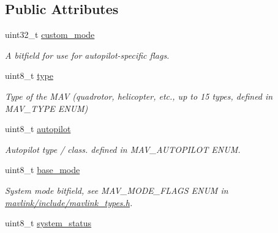 \subsection*{Public Attributes}
\begin{DoxyCompactItemize}
\item 
\hypertarget{struct____mavlink__heartbeat__t_a4d8e5d4a59f775887eaecfd58303e17d}{uint32\+\_\+t \hyperlink{struct____mavlink__heartbeat__t_a4d8e5d4a59f775887eaecfd58303e17d}{custom\+\_\+mode}}\label{struct____mavlink__heartbeat__t_a4d8e5d4a59f775887eaecfd58303e17d}

\begin{DoxyCompactList}\small\item\em A bitfield for use for autopilot-\/specific flags. \end{DoxyCompactList}\item 
\hypertarget{struct____mavlink__heartbeat__t_a2f34a5f641022acd59d9b54e69976341}{uint8\+\_\+t \hyperlink{struct____mavlink__heartbeat__t_a2f34a5f641022acd59d9b54e69976341}{type}}\label{struct____mavlink__heartbeat__t_a2f34a5f641022acd59d9b54e69976341}

\begin{DoxyCompactList}\small\item\em Type of the M\+A\+V (quadrotor, helicopter, etc., up to 15 types, defined in M\+A\+V\+\_\+\+T\+Y\+P\+E E\+N\+U\+M) \end{DoxyCompactList}\item 
\hypertarget{struct____mavlink__heartbeat__t_a5be04782d8a0bb715ad26c25cce74b9b}{uint8\+\_\+t \hyperlink{struct____mavlink__heartbeat__t_a5be04782d8a0bb715ad26c25cce74b9b}{autopilot}}\label{struct____mavlink__heartbeat__t_a5be04782d8a0bb715ad26c25cce74b9b}

\begin{DoxyCompactList}\small\item\em Autopilot type / class. defined in M\+A\+V\+\_\+\+A\+U\+T\+O\+P\+I\+L\+O\+T E\+N\+U\+M. \end{DoxyCompactList}\item 
\hypertarget{struct____mavlink__heartbeat__t_a816ec38dcbb0f4948185efbdd96ebb5e}{uint8\+\_\+t \hyperlink{struct____mavlink__heartbeat__t_a816ec38dcbb0f4948185efbdd96ebb5e}{base\+\_\+mode}}\label{struct____mavlink__heartbeat__t_a816ec38dcbb0f4948185efbdd96ebb5e}

\begin{DoxyCompactList}\small\item\em System mode bitfield, see M\+A\+V\+\_\+\+M\+O\+D\+E\+\_\+\+F\+L\+A\+G\+S E\+N\+U\+M in \hyperlink{mavlink__types_8h_source}{mavlink/include/mavlink\+\_\+types.\+h}. \end{DoxyCompactList}\item 
\hypertarget{struct____mavlink__heartbeat__t_a914b772577c4898cc5bfe4ece1c8529d}{uint8\+\_\+t \hyperlink{struct____mavlink__heartbeat__t_a914b772577c4898cc5bfe4ece1c8529d}{system\+\_\+status}}\label{struct____mavlink__heartbeat__t_a914b772577c4898cc5bfe4ece1c8529d}


\end{DoxyCompactItemize}
